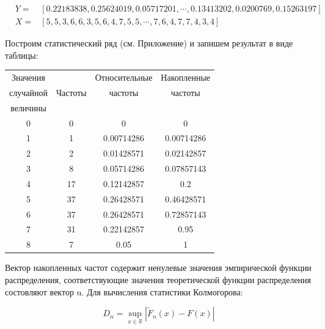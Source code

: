 \documentclass[a4paper, 14pt]{extarticle}
\begin{document}

\begin{align*}
  & Y =& \left[0.22183838, 0.25624019, 0.05717201, \cdots,  0.13413202, 0.0200769 , 0.15263197 \right] \\
  & X =& \left[5, 5, 3, 6, 6, 3, 5, 6, 4, 7, 5, 5, \cdots, 7, 6, 4, 7, 7, 4, 3, 4 \right]
\end{align*}

Построим статистический ряд (см. Приложение) и запишем результат в виде таблицы:

\begin{table}[h!]
  \centering
  \renewcommand{\arraystretch}{1.4}
  \begin{adjustbox}{max width=0.6\textwidth}
    \begin{tabular}{|c|c|c|c|}
    \hline

    Значения  & \multirow{3}{*}{Частоты} & Относительные  & Накопленные \\
    случайной &                          & частоты        & частоты     \\
    величины  &                          &                &             \\

    \hline
    0 & 0 & 0 & 0 \\
    \hline
    1 & 1 & 0.00714286 & 0.00714286 \\
    \hline
    2 & 2 & 0.01428571 & 0.02142857 \\
    \hline
    3 & 8 & 0.05714286 & 0.07857143 \\
    \hline
    4 & 17 & 0.12142857 & 0.2 \\
    \hline
    5 & 37 & 0.26428571 & 0.46428571 \\
    \hline
    6 & 37 & 0.26428571 & 0.72857143 \\
    \hline
    7 & 31 & 0.22142857 & 0.95 \\
    \hline
    8 & 7 & 0.05 & 1 \\
    \hline
    \end{tabular}
  \end{adjustbox}
\end{table}

Вектор накопленных частот содержит ненулевые значения эмпирической функции распределения,
соответствующие значения теоретической функции распределения состовляют вектор u.
Для вычисления статистики Колмогорова:

\begin{equation*}
  D_n = \sup_{x \in \mathbb{R}} \left| \tilde{F}_n (x) - F (x) \right|
\end{equation*}
\end{document}
